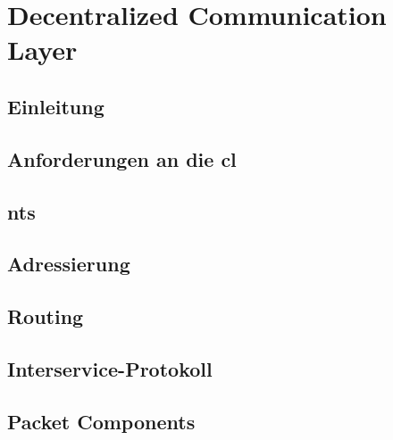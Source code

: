 \chapter{Decentralized Communication Layer}
\renewcommand{\kapitelautor}{Autor: Martin Exner}

\section{Einleitung}


\section{Anforderungen an die \gls*{cl}}


\section{\glspl*{nt}}


\section{Adressierung}


\section{Routing}


\section{Interservice-Protokoll} %


\section{Packet Components}


